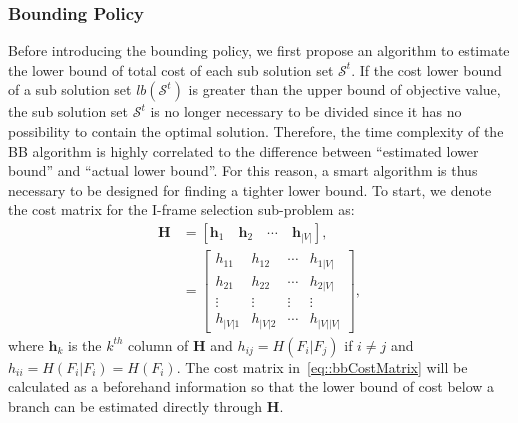 \subsubsection{Bounding Policy}
Before introducing the bounding policy, we first propose an algorithm to estimate the lower bound of total cost of each sub solution set $\mathcal{S}^t$.
If the cost lower bound of a sub solution set $lb(\mathcal{S}^t)$ is greater than the upper bound of objective value, the sub solution set $\mathcal{S}^t$ is no longer necessary to be divided since it has no possibility to contain the optimal solution.
Therefore, the time complexity of the BB algorithm is highly correlated to the difference between ``estimated lower bound'' and ``actual lower bound''.
For this reason, a smart algorithm is thus necessary to be designed for finding a tighter lower bound.
To start, we denote the cost matrix for the I-frame selection sub-problem as:
\begin{align}
\mathbf{H}
&= \left[ \mathbf{h}_1 \quad \mathbf{h}_2 \quad \cdots \quad \mathbf{h}_{|V|} \right], \nonumber \\
&= \left[ \begin{array}{cccc}
h_{11} &h_{12} &\cdots &h_{1|V|} \\
h_{21} &h_{22} &\cdots &h_{2|V|} \\
\vdots &\vdots &\vdots &\vdots \\
h_{|V|1} &h_{|V|2} &\cdots &h_{|V||V|}
\end{array} \right],
\label{eq::bbCostMatrix}
\end{align}
where $\mathbf{h}_k$ is the $k^{th}$ column of $\mathbf{H}$ and ${h_{ij} = H(F_i|F_j)}$ if ${i \neq j}$ and ${h_{ii}=H(F_i|F_i)=H(F_i)}$.
The cost matrix in~\eqref{eq::bbCostMatrix} will be calculated as a beforehand information so that the lower bound of cost below a branch can be estimated directly through $\mathbf{H}$.

